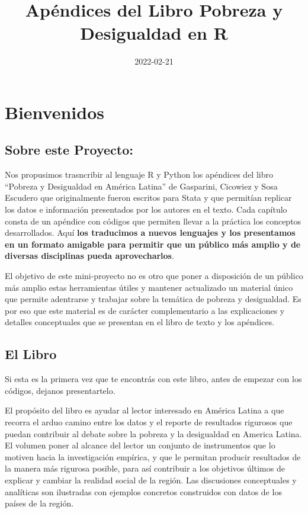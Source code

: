 \documentclass[
]{book}
\title{Apéndices del Libro Pobreza y Desigualdad en R}
\author{}
\date{\vspace{-2.5em}2022-02-21}
\begin{document}
\maketitle

{
\setcounter{tocdepth}{1}
\tableofcontents
}
\hypertarget{bienvenidos}{%
\chapter{Bienvenidos}\label{bienvenidos}}

\hypertarget{sobre-este-proyecto}{%
\section*{Sobre este Proyecto:}\label{sobre-este-proyecto}}

Nos propusimos trasncribir al lenguaje R y Python los apéndices del libro ``Pobreza y Desigualdad en América Latina'' de Gasparini, Cicowiez y Sosa Escudero que originalmente fueron escritos para Stata y que permitían replicar los datos e información presentados por los autores en el texto. Cada capítulo consta de un apéndice con códigos que permiten llevar a la práctica los conceptos desarrollados. Aquí \textbf{los traducimos a nuevos lenguajes y los presentamos en un formato amigable para permitir que un público más amplio y de diversas disciplinas pueda aprovecharlos}.

El objetivo de este mini-proyecto no es otro que poner a disposición de un público más amplio estas herramientas útiles y mantener actualizado un material único que permite adentrarse y trabajar sobre la temática de pobreza y desigualdad. Es por eso que este material es de carácter complementario a las explicaciones y detalles conceptuales que se presentan en el libro de texto y los apéndices.

\hypertarget{el-libro}{%
\section*{El Libro}\label{el-libro}}

Si esta es la primera vez que te encontrás con este libro, antes de empezar con los códigos, dejanos presentartelo.

El propósito del libro es ayudar al lector interesado en América Latina a que recorra el arduo camino entre los datos y el reporte de resultados rigurosos que puedan contribuir al debate sobre la pobreza y la desigualdad en America Latina. El volumen poner al alcance del lector un conjunto de instrumentos que lo motiven hacia la investigación empírica, y que le permitan producir resultados de la manera más rigurosa posible, para así contribuir a los objetivos últimos de explicar y cambiar la realidad social de la región. Las discusiones conceptuales y analíticas son ilustradas con ejemplos concretos construidos con datos de los países de la región.
\end{document}
